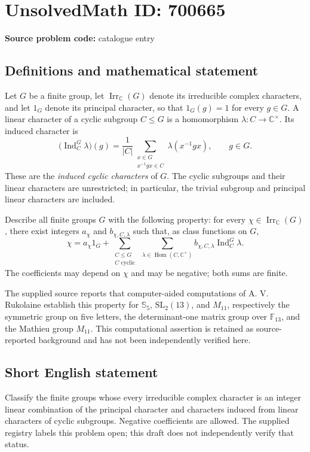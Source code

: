 \documentclass[11pt]{article}
\newcommand{\C}{\mathbb{C}}
\newcommand{\F}{\mathbb{F}}
\begin{document}
\section*{UnsolvedMath ID: 700665}
\textbf{Source problem code:} catalogue entry
\subsection{Definitions and mathematical statement}
Let \(G\) be a finite group, let \(\operatorname{Irr}_{\C}(G)\) denote its irreducible complex characters, and let \(1_G\) denote its principal character, so that \(1_G(g)=1\) for every \(g\in G\). A linear character of a cyclic subgroup \(C\leq G\) is a homomorphism \(\lambda:C\to\C^{\times}\). Its induced character is
\[
\bigl(\operatorname{Ind}_{C}^{G}\lambda\bigr)(g)
=\frac{1}{|C|}\sum_{\substack{x\in G\\x^{-1}gx\in C}}\lambda(x^{-1}gx),
\qquad g\in G.
\]
These are the \emph{induced cyclic characters} of \(G\). The cyclic subgroups and their linear characters are unrestricted; in particular, the trivial subgroup and principal linear characters are included.

Describe all finite groups \(G\) with the following property: for every \(\chi\in\operatorname{Irr}_{\C}(G)\), there exist integers \(a_\chi\) and \(b_{\chi,C,\lambda}\) such that, as class functions on \(G\),
\[
\chi=a_\chi 1_G+
\sum_{\substack{C\leq G\\C\text{ cyclic}}}
\ \sum_{\lambda\in\operatorname{Hom}(C,\C^{\times})}
 b_{\chi,C,\lambda}\operatorname{Ind}_{C}^{G}\lambda.
\]
The coefficients may depend on \(\chi\) and may be negative; both sums are finite.

The supplied source reports that computer-aided computations of A. V. Rukolaine establish this property for \(\mathbb{S}_5\), \(\mathrm{SL}_2(13)\), and \(M_{11}\), respectively the symmetric group on five letters, the determinant-one matrix group over \(\F_{13}\), and the Mathieu group \(M_{11}\). This computational assertion is retained as source-reported background and has not been independently verified here.
\subsection{Short English statement}
Classify the finite groups whose every irreducible complex character is an integer linear combination of the principal character and characters induced from linear characters of cyclic subgroups. Negative coefficients are allowed. The supplied registry labels this problem open; this draft does not independently verify that status.
\end{document}
